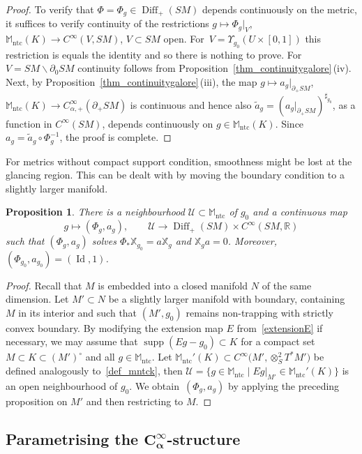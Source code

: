 \documentclass[pdftex]{sigma}
\numberwithin{equation}{section}
\newtheorem{Proposition}[Theorem]{Proposition}
\theoremstyle{definition}
\newcommand{\R}{\mathbb{R}} %
\newcommand{\M}{\mathbb{M}}
\newcommand{\1}{{\bf 1}}
\DeclareMathOperator{\supp}{supp}
\newcommand{\Id}{\operatorname{Id}}
\newcommand{\ntc}{\mathrm{ntc}}
\DeclareMathOperator{\Diff}{Diff}
\begin{document}
\begin{proof}
To verify that $\Phi=\Phi_g\in \Diff_+(SM)$ depends continuously on the metric, it suffices to verify continuity of the restrictions
$g\mapsto \Phi_g\vert_{V}$, $ \M_\ntc(K)\rightarrow C^\infty(V,SM)$, $ V\subset SM$ open.
For~${V=\Upsilon_{g_0}(U\times [0,1])}$ this restriction is equals the identity and so there is nothing to prove. For $V=SM\backslash \partial_0 SM$ continuity follows from Proposition~\ref{thm_continuitygalore}\,(iv). Next, by Proposition~\ref{thm_continuitygalore}\,(iii), the map
$g\mapsto a_g\vert_{\partial_+SM}$, $ \M_\ntc(K)\rightarrow C_{\alpha,+}^\infty(\partial_+SM)
$
is continuous and hence also $\tilde a_g = (a_g\vert_{\partial_+SM})^{\sharp_{g_0}}$, as a function in $C^\infty(SM)$, depends continuously on $g\in \M_\ntc(K)$. Since $a_{g}=\tilde a_g\circ \Phi_g^{-1}$, the proof is complete.
\end{proof}


For metrics without compact support condition, smoothness might be lost at the glancing region. This can be dealt with by moving the boundary condition to a slightly larger manifold.

\begin{Proposition}\label{prop_conjugacy2}
	There is a neighbourhood $\mathcal U\subset \M_\ntc$ of $g_0$ and a continuous map
	\[
		g\mapsto (\Phi_g,a_g),\qquad \mathcal U\rightarrow \Diff_+(SM)\times C^\infty(SM,\R)
	\]
	such that $(\Phi_g,a_g)$ solves $\Phi_*\mathbb X_{g_0}=a \mathbb X_g$ and $\mathbb X_{g}a =0$. Moreover, $(\Phi_{g_0},a_{g_0})=(\Id,1)$.
\end{Proposition}

\begin{proof}
	Recall that $M$ is embedded into a closed manifold $N$ of the same dimension. Let $M'\subset N$ be a slightly larger manifold with boundary, containing $M$ in its interior and such that $(M',g_0)$ remains non-trapping with strictly convex boundary. By modifying the extension map $E$ from~\eqref{extensionE} if necessary, we may assume that $\supp(Eg - g_0)\subset K$ for a compact set~${M\subset K \subset ( M')^\circ}$ and all $g\in \M_\ntc$. Let $\M_\ntc'(K)\subset C^\infty\bigl(M',\otimes^2_ST^*M'\bigr)$ be defined analogously to~\eqref{def_mntck}, then
	$
		\mathcal U = \{g\in \M_\ntc\mid Eg\vert_{M'} \in \M_\ntc'(K)\}
	$
	is an open neighbourhood of $g_0$. We obtain~$(\Phi_g,a_g)$ by applying the preceding proposition on $M'$ and then restricting to $M$.
\end{proof}

\subsection[Parametrising the C\_alpha\^{}infty-structure]{Parametrising the $\boldsymbol{C_\alpha^\infty}$-structure}\label{s_refG}
\end{document}
